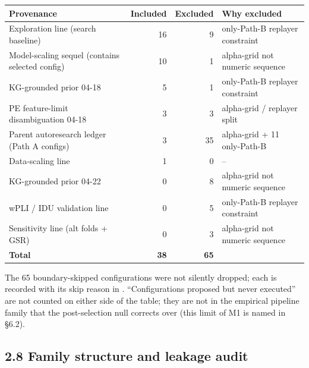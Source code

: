 \documentclass[11pt,letterpaper]{report}
\begin{document}
{}
\begin{center}
\small
\setlength{\tabcolsep}{4pt}
\renewcommand{\arraystretch}{1.12}
\begin{tabularx}{\textwidth}{@{}>{\raggedright\arraybackslash}p{}rr>{\raggedright\arraybackslash}X@{}}
\toprule
\textbf{Provenance} & \textbf{Included} & \textbf{Excluded} & \textbf{Why excluded} \\
\midrule
Exploration line (search baseline)            & 16 &  9 & only-Path-B replayer constraint \\
Model-scaling sequel (contains selected config) & 10 &  1 & alpha-grid not numeric sequence \\
KG-grounded prior 04-18                       &  5 &  1 & only-Path-B replayer constraint \\
PE feature-limit disambiguation 04-18         &  3 &  3 & alpha-grid / replayer split \\
Parent autoresearch ledger (Path A configs)   &  3 & 35 & 24 alpha-grid + 11 only-Path-B \\
Data-scaling line                             &  1 &  0 &  -- \\
KG-grounded prior 04-22                       &  0 &  8 & alpha-grid not numeric sequence \\
wPLI / IDU validation line                    &  0 &  5 & only-Path-B replayer constraint \\
Sensitivity line (alt folds + GSR)            &  0 &  3 & alpha-grid not numeric sequence \\
\midrule
\textbf{Total}                                & \textbf{38} & \textbf{65} & \\
\bottomrule
\end{tabularx}
\end{center}

The 65 boundary-skipped configurations were not silently dropped; each is recorded with its skip reason in . ``Configurations proposed but never executed'' are not counted on either side of the table; they are not in the empirical pipeline family that the post-selection null corrects over (this limit of M1 is named in \S6.2).

\subsection*{2.8 Family structure and leakage audit}
\end{document}
